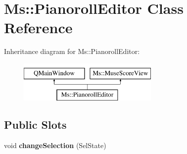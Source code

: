 \hypertarget{class_ms_1_1_pianoroll_editor}{}\section{Ms\+:\+:Pianoroll\+Editor Class Reference}
\label{class_ms_1_1_pianoroll_editor}
Inheritance diagram for Ms\+:\+:Pianoroll\+Editor\+:\begin{figure}[H]
\begin{center}
\leavevmode
\includegraphics[height=2.000000cm]{class_ms_1_1_pianoroll_editor}
\end{center}
\end{figure}
\subsection*{Public Slots}
\begin{DoxyCompactItemize}
\item 
\mbox{\label{class_ms_1_1_pianoroll_editor_a17b44ad129e13eb1ee6493a6cc138fe6}} 
void {\bfseries change\+Selection} (Sel\+State)
\end{DoxyCompactItemize}
